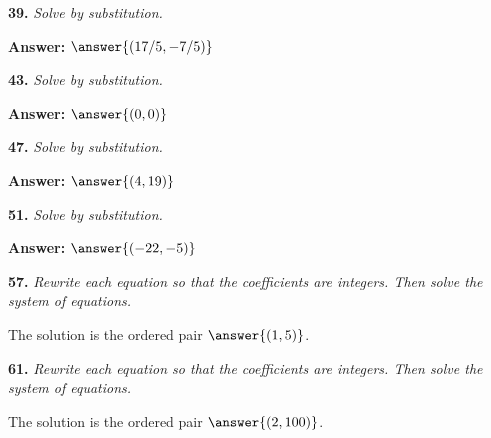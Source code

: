\documentclass{ximera}
\begin{document}
\begin{problem}
\textbf{39.} \emph{Solve by substitution.}\quad {}

\begin{multipleChoice}
\end{multipleChoice}

\textbf{Answer:} $\answer{(17/5,-7/5)}$
\end{problem}

\begin{problem}
\textbf{43.} \emph{Solve by substitution.}\quad {}

\begin{multipleChoice}
\end{multipleChoice}

\textbf{Answer:} $\answer{(0,0)}$
\end{problem}

\begin{problem}
\textbf{47.} \emph{Solve by substitution.}\quad {}

\begin{multipleChoice}
\end{multipleChoice}

\textbf{Answer:} $\answer{(4, 19)}$
\end{problem}

\begin{problem}
\textbf{51.} \emph{Solve by substitution.}\quad {}

\begin{multipleChoice}
\end{multipleChoice}

\textbf{Answer:} $\answer{(-22,-5)}$
\end{problem}

\begin{problem}
\textbf{57.} \emph{Rewrite each equation so that the coefficients are integers. Then solve the system of equations.}\quad {}

The solution is the ordered pair $\answer{(1, 5)}$.
\end{problem}

\begin{problem}
\textbf{61.} \emph{Rewrite each equation so that the coefficients are integers. Then solve the system of equations.}\quad {}

The solution is the ordered pair $\answer{(2, 100)}$.
\end{problem}
\end{document}
